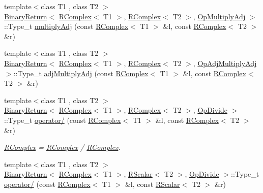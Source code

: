 \begin{DoxyCompactItemize}
\item 
{\footnotesize template$<$class T1 , class T2 $>$ }\\\mbox{\hyperlink{structENSEM_1_1BinaryReturn}{Binary\+Return}}$<$ \mbox{\hyperlink{classENSEM_1_1RComplex}{R\+Complex}}$<$ T1 $>$, \mbox{\hyperlink{classENSEM_1_1RComplex}{R\+Complex}}$<$ T2 $>$, \mbox{\hyperlink{structENSEM_1_1OpMultiplyAdj}{Op\+Multiply\+Adj}} $>$\+::Type\+\_\+t \mbox{\hyperlink{group__rcomplex_ga7147ce299498e423c79851ee598dcde3}{multiply\+Adj}} (const \mbox{\hyperlink{classENSEM_1_1RComplex}{R\+Complex}}$<$ T1 $>$ \&l, const \mbox{\hyperlink{classENSEM_1_1RComplex}{R\+Complex}}$<$ T2 $>$ \&r)
\item 
{\footnotesize template$<$class T1 , class T2 $>$ }\\\mbox{\hyperlink{structENSEM_1_1BinaryReturn}{Binary\+Return}}$<$ \mbox{\hyperlink{classENSEM_1_1RComplex}{R\+Complex}}$<$ T1 $>$, \mbox{\hyperlink{classENSEM_1_1RComplex}{R\+Complex}}$<$ T2 $>$, \mbox{\hyperlink{structENSEM_1_1OpAdjMultiplyAdj}{Op\+Adj\+Multiply\+Adj}} $>$\+::Type\+\_\+t \mbox{\hyperlink{group__rcomplex_gac9d1c7be9449dc3fbb0a17d63a51dc17}{adj\+Multiply\+Adj}} (const \mbox{\hyperlink{classENSEM_1_1RComplex}{R\+Complex}}$<$ T1 $>$ \&l, const \mbox{\hyperlink{classENSEM_1_1RComplex}{R\+Complex}}$<$ T2 $>$ \&r)
\item 
{\footnotesize template$<$class T1 , class T2 $>$ }\\\mbox{\hyperlink{structENSEM_1_1BinaryReturn}{Binary\+Return}}$<$ \mbox{\hyperlink{classENSEM_1_1RComplex}{R\+Complex}}$<$ T1 $>$, \mbox{\hyperlink{classENSEM_1_1RComplex}{R\+Complex}}$<$ T2 $>$, \mbox{\hyperlink{structENSEM_1_1OpDivide}{Op\+Divide}} $>$\+::Type\+\_\+t \mbox{\hyperlink{group__rcomplex_ga60f2bd381cb984f9f438b894a2aef66f}{operator/}} (const \mbox{\hyperlink{classENSEM_1_1RComplex}{R\+Complex}}$<$ T1 $>$ \&l, const \mbox{\hyperlink{classENSEM_1_1RComplex}{R\+Complex}}$<$ T2 $>$ \&r)
\begin{DoxyCompactList}\small\item\em \mbox{\hyperlink{classENSEM_1_1RComplex}{R\+Complex}} = \mbox{\hyperlink{classENSEM_1_1RComplex}{R\+Complex}} / \mbox{\hyperlink{classENSEM_1_1RComplex}{R\+Complex}}. \end{DoxyCompactList}\item 
{\footnotesize template$<$class T1 , class T2 $>$ }\\\mbox{\hyperlink{structENSEM_1_1BinaryReturn}{Binary\+Return}}$<$ \mbox{\hyperlink{classENSEM_1_1RComplex}{R\+Complex}}$<$ T1 $>$, \mbox{\hyperlink{classENSEM_1_1RScalar}{R\+Scalar}}$<$ T2 $>$, \mbox{\hyperlink{structENSEM_1_1OpDivide}{Op\+Divide}} $>$\+::Type\+\_\+t \mbox{\hyperlink{group__rcomplex_ga249a0c4eb26560012c5090b615fadf26}{operator/}} (const \mbox{\hyperlink{classENSEM_1_1RComplex}{R\+Complex}}$<$ T1 $>$ \&l, const \mbox{\hyperlink{classENSEM_1_1RScalar}{R\+Scalar}}$<$ T2 $>$ \&r)

\end{DoxyCompactItemize}
